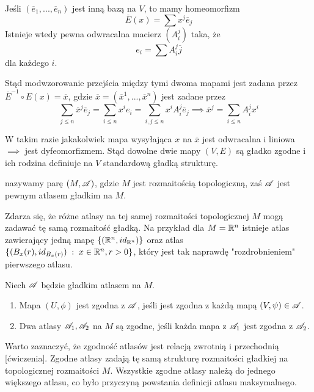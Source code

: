 \begin{example}
      Jeśli $(\overline{e}_1,...,\overline{e}_n)$ jest inną bazą na $V$, to mamy homeomorfizm 
      $$\overline{E}(x)=\sum x^j\overline{e}_j$$ 
      Istnieje wtedy pewna odwracalna macierz $(A_i^j)$ taka, że 
      $$e_i=\sum A^j_i\overline{j}$$ 
      dla każdego $i$. 

      Stąd modwzorowanie przejścia między tymi dwoma mapami jest zadana przez $\overline{E}^{-1}\circ E(x)=\overline{x}$, gdzie $\overline{x}=(\overline{x}^1,...,\overline{x}^n)$ jest zadane przez
      $$\sum_{j\leq n}\overline{x}^j\overline{e}_j=\sum_{i\leq n}x^ie_i=\sum_{i,j\leq n} x^iA_i^j\overline{e}_j\implies \overline{x}^j=\sum_{i\leq n} A_i^jx^i$$

      W takim razie jakakolwiek mapa wysyłająca $x$ na $\overline{x}$ jest odwracalna i liniowa $\implies$ jest dyfeomorfizmem. Stąd dowolne dwie mapy $(V, E)$ są gładko zgodne i ich rodzina definiuje na $V$ standardową gładką strukturę.
\end{example}

\begin{definition}
   nazywamy parę $(M, \mathcal{A})$, gdzie $M$ jest rozmaitością topologiczną, zaś $\mathcal{A}$ jest pewnym atlasem gładkim na $M$.
\end{definition}

Zdarza się, że różne atlasy na tej samej rozmaitości topologicznej $M$ mogą zadawać tę samą rozmaitość gładką. Na przykład dla $M=\mathbb{R}^n$ istnieje atlas zawierający jedną mapę $\{(\mathbb{R}^n, id_{\mathbb{R}^n})\}$ oraz atlas $\{(B_x(r), id_{B_x(r)})\;:\;x\in\mathbb{R}^n, r>0\}$, który jest tak naprawdę "rozdrobnieniem" pierwszego atlasu. 

\begin{definition}
  Niech $\mathcal{A}$ będzie gładkim atlasem na $M$.

  \begin{enumerate}
    \item Mapa $(U, \phi)$ jest zgodna z $\mathcal{A}$, jeśli jest zgodna z każdą mapą $(V, \psi)\in \mathcal{A}$.
    \item Dwa atlasy $\mathcal{A}_1, \mathcal{A}_2$ na $M$ są zgodne, jeśli każda mapa z $\mathcal{A}_1$ jest zgodna z $\mathcal{A}_2$.
  \end{enumerate}
\end{definition}

Warto zaznaczyć, że zgodność atlasów jest relacją zwrotnią i przechodnią [ćwiczenia]. Zgodne atlasy zadają tę samą strukturę rozmaitości gładkiej na topologicznej rozmaitości $M$. Wszystkie zgodne atlasy należą do jednego większego atlasu, co było przyczyną powstania definicji atlasu maksymalnego.

